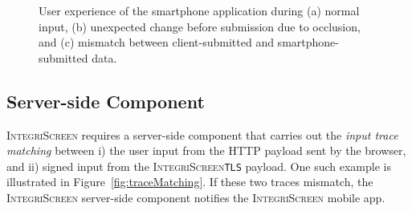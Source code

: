\documentclass[sigconf, anonymous, balance=false]{acmart}
\newcommand{\tls}{\texttt{TLS}\xspace}
\newcommand{\sysname}{\textsc{IntegriScreen}\xspace}
\newcommand{\name}{\sysname}
\begin{document}
\begin{figure}[t]
{		\label{fig:userExperience:inputComparison}
	}
	\hfill
	\hfill
	\null
	\caption{
		User experience of the smartphone application during (a) normal input, (b) unexpected change before submission due to occlusion, and (c) mismatch between client-submitted and smartphone-submitted data.
}
	\label{fig:userExperience}
\end{figure}




\subsection{Server-side Component}
\label{sec:systemDesign:webserver}

\sysname requires a server-side component that carries out the \emph{input trace matching} between i) the user input from the HTTP payload sent by the browser, and ii) signed input from the \sysname \tls payload. One such example is illustrated in Figure~\ref{fig:traceMatching}. If these two traces mismatch, the \name server-side component notifies the \name mobile app.
\end{document}
